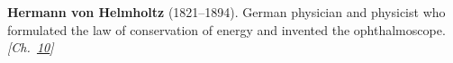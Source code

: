 \textbf{Hermann von Helmholtz} (1821–1894). German physician and physicist who formulated the law of conservation of energy and invented the ophthalmoscope. \emph{[Ch.~\hyperref[ch:solarfusionquantumtunneling]{10}]}

